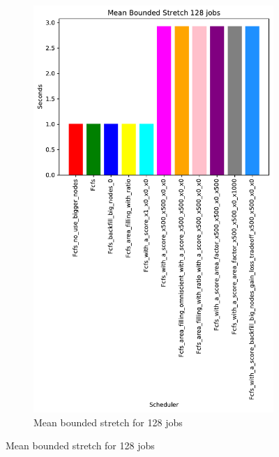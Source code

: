 \documentclass[a4paper]{article}
\begin{document}
\begin{figure}[H]
\begin{subfigure}[b]{0.4\linewidth}\centering\includegraphics[width=0.7\linewidth]{MBSS/plot/Results_Size_And_Data_2022-03-01->2022-03-03_V9271_Mean_Stretch_With_a_Minimum_128_450_128_32_256_4_1024.pdf}\caption{Mean bounded stretch for 128 jobs}\label{45}\end{subfigure}

\end{figure}
\end{document}
